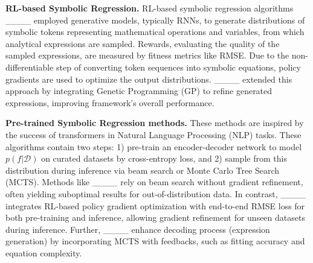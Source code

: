 \textbf{RL-based Symbolic Regression.} 
RL-based symbolic regression algorithms 
____ employed generative models, typically RNNs, to generate distributions of symbolic tokens representing mathematical operations and variables, from which analytical expressions are sampled. Rewards, evaluating the quality of the sampled expressions, are measured by fitness metrics like RMSE. Due to the non-differentiable step of converting token sequences into symbolic equations, policy gradients are used to optimize the output distributions. ____ extended this approach by integrating Genetic Programming (GP) to refine generated expressions, improving framework's overall performance.


\textbf{Pre-trained Symbolic Regression methods.} 
These methods are inspired by the success of transformers in Natural Language Processing (NLP) tasks. These algorithms contain two steps: 1) pre-train an encoder-decoder network to model $p(f|\mathcal{D})$ on curated datasets by cross-entropy loss, and 2) sample from this distribution during inference via beam search or Monte Carlo Tree Search (MCTS). Methods like ____ rely on beam search without gradient refinement, often yielding suboptimal results for out-of-distribution data. In contrast, ____ integrates RL-based policy gradient optimization with end-to-end RMSE loss for both pre-training and inference, allowing gradient refinement for unseen datasets during inference. Further, ____ enhance decoding process (expression generation) by incorporating MCTS with feedbacks, such as fitting accuracy and equation complexity.